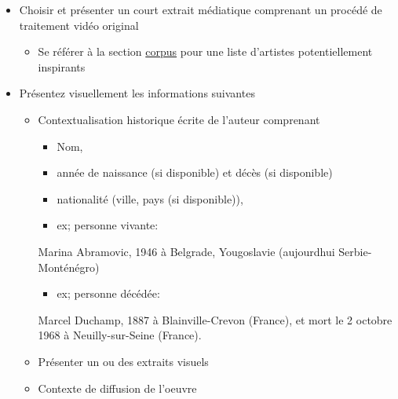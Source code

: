 \documentclass[
]{book}
\newenvironment{Shaded}{\begin{snugshade}}{\end{snugshade}}
\newcommand{\NormalTok}[1]{#1}
\providecommand{\tightlist}{%
  \setlength{\itemsep}{0pt}\setlength{\parskip}{0pt}}
\begin{document}
\begin{itemize}
\tightlist
\item
  Choisir et présenter un court extrait médiatique comprenant un procédé de traitement vidéo original

  \begin{itemize}
  \tightlist
  \item
    Se référer à la section \protect\hyperlink{corpus}{corpus} pour une liste d'artistes potentiellement inspirants
  \end{itemize}
\item
  Présentez visuellement les informations suivantes

  \begin{itemize}
  \tightlist
  \item
    Contextualisation historique écrite de l'auteur comprenant

    \begin{itemize}
    \tightlist
    \item
      Nom,
    \item
      année de naissance (si disponible) et décès (si disponible)
    \item
      nationalité (ville, pays (si disponible)),
    \item
      ex; personne vivante:
    \end{itemize}

\begin{Shaded}
\begin{Highlighting}[]
\NormalTok{Marina Abramovic, 1946 à Belgrade, Yougoslavie (aujourd\textquotesingle{}hui Serbie{-}Monténégro)}
\end{Highlighting}
\end{Shaded}

    \begin{itemize}
    \tightlist
    \item
      ex; personne décédée:
    \end{itemize}

\begin{Shaded}
\begin{Highlighting}[]
\NormalTok{Marcel Duchamp, 1887 à Blainville{-}Crevon (France), et mort le 2 octobre 1968 à Neuilly{-}sur{-}Seine (France).}
\end{Highlighting}
\end{Shaded}
  \item
    Présenter un ou des extraits visuels
  \item
    Contexte de diffusion de l'oeuvre


\end{itemize}
\end{itemize}
\end{document}
